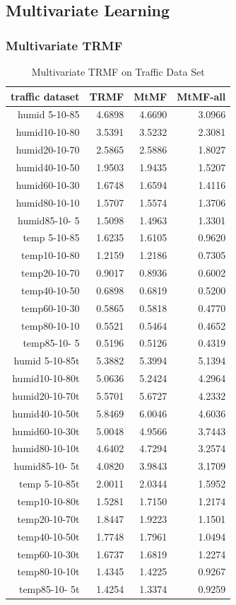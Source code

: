 \subsection{Multivariate Learning}
\subsubsection{Multivariate TRMF}

\begin{table}[htbp]
\caption{Multivariate TRMF on Traffic Data Set}
\label{traffic}
\begin{tabular}{r | r r r}
traffic dataset	&TRMF	&MtMF	&MtMF-all \\ \hline
humid 5-10-85	&4.6898	&4.6690	&3.0966\\
humid10-10-80	&3.5391	&3.5232	&2.3081\\
humid20-10-70	&2.5865	&2.5886	&1.8027\\
humid40-10-50	&1.9503	&1.9435	&1.5207\\
humid60-10-30	&1.6748	&1.6594	&1.4116\\
humid80-10-10	&1.5707	&1.5574	&1.3706\\
humid85-10- 5	&1.5098	&1.4963	&1.3301\\
 temp 5-10-85	&1.6235	&1.6105	&0.9620\\
 temp10-10-80	&1.2159	&1.2186	&0.7305\\
 temp20-10-70	&0.9017	&0.8936	&0.6002\\
 temp40-10-50	&0.6898	&0.6819	&0.5200\\
 temp60-10-30	&0.5865	&0.5818	&0.4770\\
 temp80-10-10	&0.5521	&0.5464	&0.4652\\
 temp85-10- 5	&0.5196	&0.5126	&0.4319\\
humid 5-10-85t	&5.3882	&5.3994	&5.1394\\
humid10-10-80t	&5.0636	&5.2424	&4.2964\\
humid20-10-70t	&5.5701	&5.6727	&4.2332\\
humid40-10-50t	&5.8469	&6.0046	&4.6036\\
humid60-10-30t	&5.0048	&4.9566	&3.7443\\
humid80-10-10t	&4.6402	&4.7294	&3.2574\\
humid85-10- 5t	&4.0820	&3.9843	&3.1709\\
 temp 5-10-85t	&2.0011	&2.0344	&1.5952\\
 temp10-10-80t	&1.5281	&1.7150	&1.2174\\
 temp20-10-70t	&1.8447	&1.9223	&1.1501\\
 temp40-10-50t	&1.7748	&1.7961	&1.0494\\
 temp60-10-30t	&1.6737	&1.6819	&1.2274\\
 temp80-10-10t	&1.4345	&1.4225	&0.9267\\
 temp85-10- 5t	&1.4254	&1.3374	&0.9259

\end{tabular}
\end{table}

